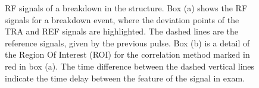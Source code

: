  \begin{figure}[h]
\centering
   \hspace{1mm}
\caption{RF signals of a breakdown in the structure. Box (a) shows the RF signals for a breakdown event, where the deviation points of the TRA and REF signals are highlighted. The dashed lines are the reference signals, given by the previous pulse. Box (b) is a detail of the Region Of Interest (ROI) for the correlation method marked in red in box (a). The time difference between the dashed vertical lines indicate the time delay between the feature of the signal in exam.}
 \label{dev_pt}
 \end{figure}


